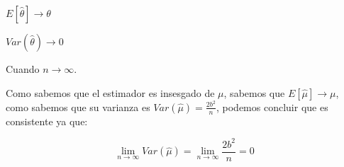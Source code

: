 \documentclass[a4paper, 10pt]{article} %
\begin{document}
\begin{description}
	\item $E[\hat{\theta}] \rightarrow \theta$
	\item $Var(\hat{\theta}) \rightarrow 0$
\end{description}
Cuando $n \rightarrow \infty$.

Como sabemos que el estimador es insesgado de $\mu$, sabemos que $E[\hat{\mu}] \rightarrow \mu$, como sabemos que su varianza
es $Var(\hat{\mu}) = \frac{2 b^2}{n}$, podemos concluir que es consistente ya que:

$$\lim\limits_{n \rightarrow \infty} Var(\hat{\mu}) = \lim\limits_{n \rightarrow \infty} \frac{2 b^2}{n} = 0$$
\end{document}

